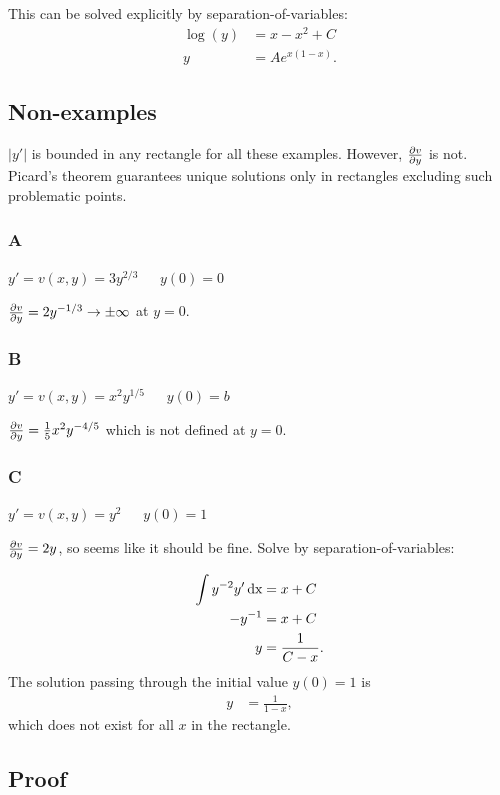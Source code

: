 This can be solved explicitly by separation-of-variables:
\begin{align*}
  \log(y) &= x- x^2 + C\\
  y       &= Ae^{x(1-x)}.
\end{align*}


\subsection{Non-examples}

$|y'|$ is bounded in any rectangle for all these examples. However,
$\frac{\partial v}{\partial y}$ is not. Picard's theorem guarantees unique solutions only in
rectangles excluding such problematic points.

\subsubsection{A}
$y' = v(x, y) = 3y^{2/3}  ~~~~~~~ y(0) = 0$

$\frac{\partial v}{\partial y} = 2y^{-1/3} \to \pm \infty$ at $y=0$.


\subsubsection{B}
$y' = v(x, y) = x^2y^{1/5} ~~~~~~~ y(0) = b$

$\frac{\partial v}{\partial y} = \frac{1}{5}x^2y^{-4/5}$ which is not defined at $y=0$.

\subsubsection{C}
$y' = v(x, y) = y^2       ~~~~~~~ y(0) = 1$

$\frac{\partial v}{\partial y} = 2y$, so seems like it should be fine. Solve by
separation-of-variables:

\begin{align*}
  \int y^{-2} y' \operatorname{\text{dx}} &= x + C\\
  -y^{-1}            &= x + C\\
  y                 &= \frac{1}{C - x}.
\end{align*}
The solution passing through the initial value $y(0) = 1$ is
\begin{align*}
  y                  &= \frac{1}{1 - x},
\end{align*}
which does not exist for all $x$ in the rectangle.


\subsection{Proof}

